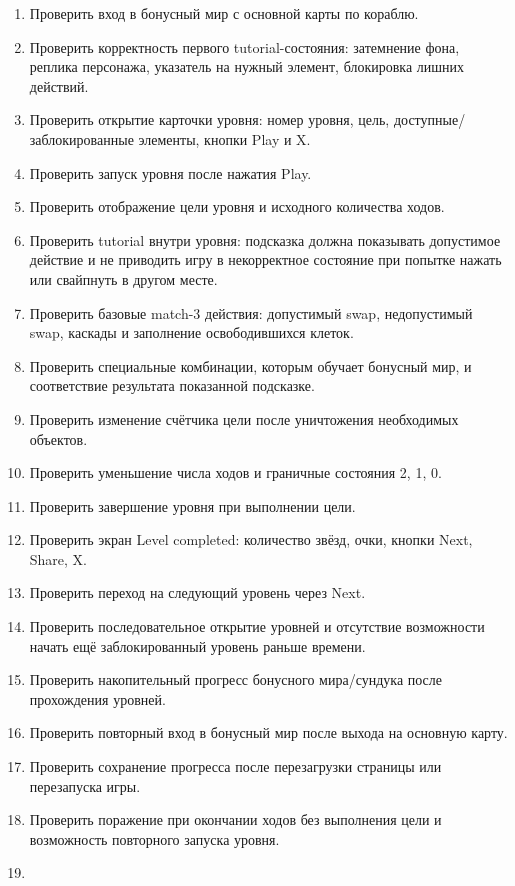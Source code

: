 \documentclass{ZGJournalArticle_2026}
\providecommand{\tightlist}{%
  \setlength{\itemsep}{0pt}\setlength{\parskip}{0pt}}
\begin{document}
\begin{enumerate}
\def\labelenumi{\arabic{enumi}.}
\tightlist
\item
  Проверить вход в бонусный мир с основной карты по кораблю.
\item
  Проверить корректность первого tutorial-состояния: затемнение фона,
  реплика персонажа, указатель на нужный элемент, блокировка лишних
  действий.
\item
  Проверить открытие карточки уровня: номер уровня, цель,
  доступные/заблокированные элементы, кнопки Play и X.
\item
  Проверить запуск уровня после нажатия Play.
\item
  Проверить отображение цели уровня и исходного количества ходов.
\item
  Проверить tutorial внутри уровня: подсказка должна показывать
  допустимое действие и не приводить игру в некорректное состояние при
  попытке нажать или свайпнуть в другом месте.
\item
  Проверить базовые match-3 действия: допустимый swap, недопустимый
  swap, каскады и заполнение освободившихся клеток.
\item
  Проверить специальные комбинации, которым обучает бонусный мир, и
  соответствие результата показанной подсказке.
\item
  Проверить изменение счётчика цели после уничтожения необходимых
  объектов.
\item
  Проверить уменьшение числа ходов и граничные состояния 2, 1, 0.
\item
  Проверить завершение уровня при выполнении цели.
\item
  Проверить экран Level completed: количество звёзд, очки, кнопки Next,
  Share, X.
\item
  Проверить переход на следующий уровень через Next.
\item
  Проверить последовательное открытие уровней и отсутствие возможности
  начать ещё заблокированный уровень раньше времени.
\item
  Проверить накопительный прогресс бонусного мира/сундука после
  прохождения уровней.
\item
  Проверить повторный вход в бонусный мир после выхода на основную
  карту.
\item
  Проверить сохранение прогресса после перезагрузки страницы или
  перезапуска игры.
\item
  Проверить поражение при окончании ходов без выполнения цели и
  возможность повторного запуска уровня.
\item

\end{enumerate}
\end{document}
